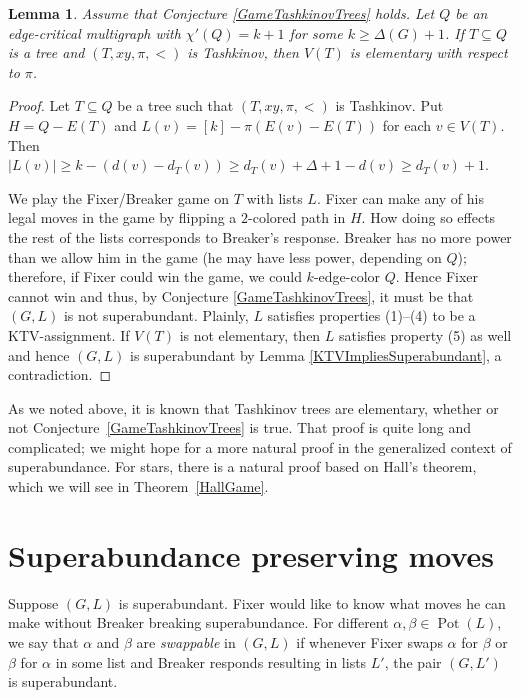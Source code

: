 \documentclass[12pt,reqno]{amsart}
\theoremstyle{plain}
\newtheorem{lem}[thm]{Lemma}
\theoremstyle{definition}
\theoremstyle{remark}
\newcommand{\irange}[1]{\left[#1\right]}
\newcommand{\parens}[1]{\left( #1 \right)}
\newcommand{\pot}{\operatorname{Pot}}
\begin{document}
\begin{lem}\label{TashkinovGameImpliesTashkinovElementary}
Assume that Conjecture \ref{GameTashkinovTrees} holds.  Let $Q$ be an
edge-critical multigraph with $\chi'(Q) = k + 1$ for some $k \ge \Delta(G) + 1$.
If $T \subseteq Q$ is a tree and $\parens{T, xy, \pi, <}$ is Tashkinov, then
$V(T)$ is elementary with respect to $\pi$.
\end{lem}
\begin{proof}
Let $T \subseteq Q$ be a tree such that $\parens{T, xy, \pi, <}$ is Tashkinov.
Put $H = Q - E(T)$ and $L(v) = \irange{k} - \pi\parens{E(v) - E(T)}$ for each $v \in V(T)$.  
Then $|L(v)| \ge k - (d(v) - d_T(v)) \ge d_T(v) + \Delta + 1 - d(v) \ge d_T(v) + 1$.  

We play the Fixer/Breaker game on $T$ with lists $L$.  Fixer can make any of his legal moves in the game by flipping a $2$-colored path in $H$.  How doing so effects the rest of the lists corresponds to Breaker's response.  Breaker has no more power than we allow him in the game (he may have less power, depending on $Q$); therefore, if Fixer could win the game, we could $k$-edge-color $Q$.  Hence Fixer cannot win and thus, by Conjecture \ref{GameTashkinovTrees}, it must be that $(G, L)$ is not superabundant.  Plainly, $L$ satisfies properties (1)--(4) to be a KTV-assignment.  If $V(T)$ is not elementary, then $L$ satisfies property (5) as well and hence $(G, L)$ is superabundant by Lemma \ref{KTVImpliesSuperabundant}, a contradiction.
\end{proof}

As we noted above, it is known that Tashkinov trees are elementary, whether
or not Conjecture~\ref{GameTashkinovTrees} is true.  That proof is quite long
and complicated; we might hope for a more natural proof in the generalized
context of superabundance.  For stars, there is a natural proof based on
Hall's theorem, which we will see in Theorem~\ref{HallGame}.

\section{Superabundance preserving moves}
Suppose $(G, L)$ is superabundant.  Fixer would like to know what moves he can make without Breaker breaking superabundance.  For different $\alpha, \beta \in \pot(L)$, we say that $\alpha$ and $\beta$ are \emph{swappable} in $(G, L)$ if whenever Fixer swaps $\alpha$ for $\beta$ or $\beta$ for $\alpha$ in some list and Breaker responds resulting in lists $L'$, the pair $(G, L')$ is superabundant.
\end{document}
